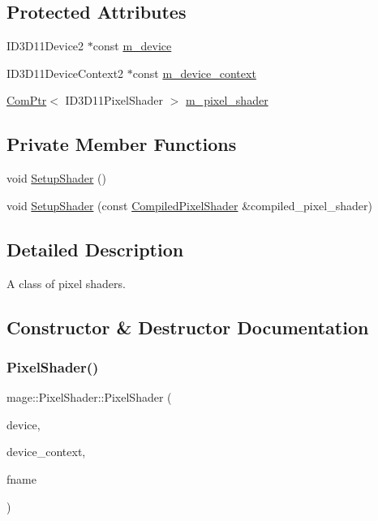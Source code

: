 \subsection*{Protected Attributes}
\begin{DoxyCompactItemize}
\item 
I\+D3\+D11\+Device2 $\ast$const \hyperlink{classmage_1_1_pixel_shader_a7fa34f27d8f39db2403edac28ddecc68}{m\+\_\+device}
\item 
I\+D3\+D11\+Device\+Context2 $\ast$const \hyperlink{classmage_1_1_pixel_shader_a6b9bbf18f255b061fb75453f32a78720}{m\+\_\+device\+\_\+context}
\item 
\hyperlink{namespacemage_ae74f374780900893caa5555d1031fd79}{Com\+Ptr}$<$ I\+D3\+D11\+Pixel\+Shader $>$ \hyperlink{classmage_1_1_pixel_shader_a1dd0f87be1c1f7fe5a1bb2737263222f}{m\+\_\+pixel\+\_\+shader}
\end{DoxyCompactItemize}
\subsection*{Private Member Functions}
\begin{DoxyCompactItemize}
\item 
void \hyperlink{classmage_1_1_pixel_shader_a5297d3d12153f9a866751b623203c5aa}{Setup\+Shader} ()
\item 
void \hyperlink{classmage_1_1_pixel_shader_a3010aefe86be3e1efaf2f1c010c42a48}{Setup\+Shader} (const \hyperlink{structmage_1_1_compiled_pixel_shader}{Compiled\+Pixel\+Shader} \&compiled\+\_\+pixel\+\_\+shader)
\end{DoxyCompactItemize}


\subsection{Detailed Description}
A class of pixel shaders. 

\subsection{Constructor \& Destructor Documentation}
\hypertarget{classmage_1_1_pixel_shader_a0e8952d69f42380d289e7b4bb8035b3e}{}\label{classmage_1_1_pixel_shader_a0e8952d69f42380d289e7b4bb8035b3e} 
\subsubsection{\texorpdfstring{Pixel\+Shader()}{PixelShader()}\hspace{0.1cm}{\footnotesize\ttfamily [1/4]}}
{\footnotesize\ttfamily mage\+::\+Pixel\+Shader\+::\+Pixel\+Shader (\begin{DoxyParamCaption}\item[{I\+D3\+D11\+Device2 $\ast$}]{device,  }\item[{I\+D3\+D11\+Device\+Context2 $\ast$}]{device\+\_\+context,  }\item[{const wstring \&}]{fname }\end{DoxyParamCaption})\hspace{0.3cm}{\ttfamily [explicit]}}

